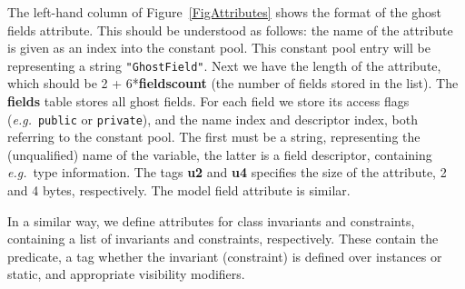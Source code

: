 The left-hand column of Figure~\ref{FigAttributes} shows the format of
the ghost fields attribute. This should be understood as follows: the
name of the attribute is given as an index into the constant
pool. This constant pool entry will be representing a string
\texttt{"Ghost\unsc Field"}. Next we have the length of the attribute,
which should be 2 + 6*\textbf{fields\unsc count} (the number of fields
stored in the list). The \textbf{fields} table stores all ghost
fields. For each field we store its access flags (\emph{e.g.}\
\texttt{public} or
\texttt{private}), and the name index and descriptor index, both
referring to the constant pool. The first must be a string,
representing the (unqualified) name of the variable, the latter is a
field descriptor, containing \emph{e.g.}\ type information.  The tags
\textbf{u2} and \textbf{u4} specifies the size of the attribute, 2 and
4 bytes, respectively. The model field attribute is similar.

In a similar way, we define attributes for class invariants and
constraints, containing a list of invariants and constraints,
respectively. These contain the predicate, a tag whether the
invariant (constraint) is defined over instances or static, and
appropriate visibility modifiers.




